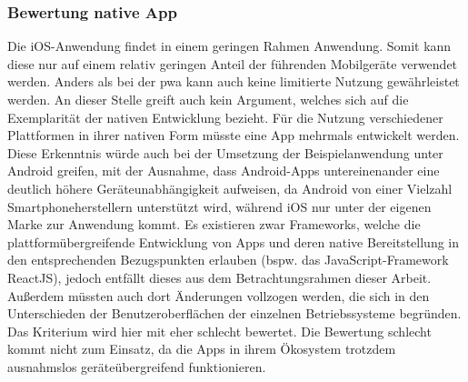 \subsubsection{Bewertung native App}
Die iOS-Anwendung findet in einem geringen Rahmen Anwendung. Somit kann diese nur auf einem relativ geringen Anteil der führenden Mobilgeräte verwendet werden. Anders als bei der \ac{pwa} kann auch keine limitierte Nutzung gewährleistet werden. An dieser Stelle greift auch kein Argument, welches sich auf die Exemplarität der nativen Entwicklung bezieht. Für die Nutzung verschiedener Plattformen in ihrer nativen Form müsste eine App mehrmals entwickelt werden. Diese Erkenntnis würde auch bei der Umsetzung der Beispielanwendung unter Android greifen, mit der Ausnahme, dass Android-Apps untereinenander eine deutlich höhere Geräteunabhängigkeit aufweisen, da Android von einer Vielzahl Smartphoneherstellern unterstützt wird, während iOS nur unter der eigenen Marke zur Anwendung kommt. Es existieren zwar Frameworks, welche die plattformübergreifende Entwicklung von Apps und deren native Bereitstellung in den entsprechenden Bezugspunkten erlauben (bspw. das JavaScript-Framework ReactJS), jedoch entfällt dieses aus dem Betrachtungsrahmen dieser Arbeit. Außerdem müssten auch dort Änderungen vollzogen werden, die sich in den Unterschieden der Benutzeroberflächen der einzelnen Betriebssysteme begründen. Das Kriterium wird hier mit eher schlecht bewertet. Die Bewertung schlecht kommt nicht zum Einsatz, da die Apps in ihrem Ökosystem trotzdem ausnahmslos geräteübergreifend funktionieren.